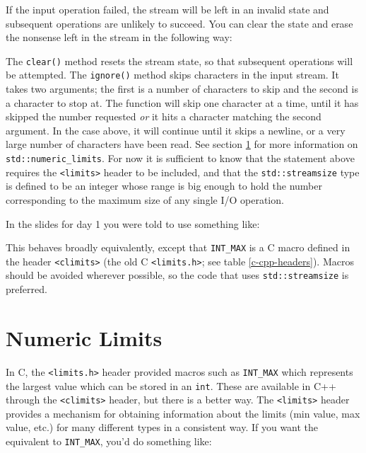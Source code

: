 \documentclass[a4paper]{scrartcl}
\begin{document}


If the input operation failed, the stream will be left in an invalid state and subsequent operations are unlikely to succeed. You can clear the state and erase the nonsense left in the stream in the following way:



The \texttt{clear()} method resets the stream state, so that subsequent operations will be attempted. The \texttt{ignore()} method skips characters in the input stream. It takes two arguments; the first is a number of characters to skip and the second is a character to stop at. The function will skip one character at a time, until it has skipped the number requested \emph{or} it hits a character matching the second argument. In the case above, it will continue until it skips a newline, or a very large number of characters have been read. See section \ref{numeric-limits} for more information on \texttt{std::numeric\_limits}. For now it is sufficient to know that the statement above requires the \texttt{<limits>} header to be included, and that the \texttt{std::streamsize} type is defined to be an integer whose range is big enough to hold the number corresponding to the maximum size of any single I/O operation.

In the slides for day 1 you were told to use something like:



This behaves broadly equivalently, except that \texttt{INT\_MAX} is a C macro defined in the header \texttt{<climits>} (the old C \texttt{<limits.h>}; see table \ref{c-cpp-headers}). Macros should be avoided wherever possible, so the code that uses \texttt{std::streamsize} is preferred.

\section{Numeric Limits}\label{numeric-limits}
In C, the \texttt{<limits.h>} header provided macros such as \texttt{INT\_MAX} which represents the largest value which can be stored in an \texttt{int}. These are available in C++ through the \texttt{<climits>} header, but there is a better way. The \texttt{<limits>} header provides a mechanism for obtaining information about the limits (min value, max value, etc.) for many different types in a consistent way. If you want the equivalent to \texttt{INT\_MAX}, you'd do something like:
\end{document}
